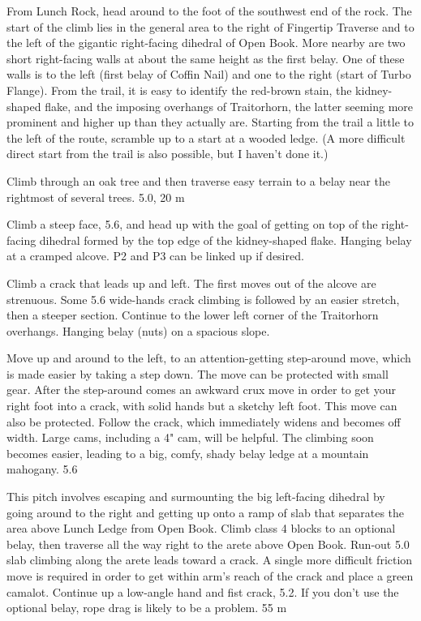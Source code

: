 \documentclass{tahquitz}
\begin{document}
From Lunch Rock, head around to the foot of the southwest end of the
rock.  The start of the climb lies in the general area to the right of
Fingertip Traverse and to the left of the gigantic right-facing
dihedral of Open Book.  More nearby are two short right-facing walls
at about the same height as the first belay.  One of these walls is to
the left (first belay of Coffin Nail) and one to the right (start of
Turbo Flange).  From the trail, it is easy to identify the red-brown
stain, the kidney-shaped flake, and the imposing overhangs of
Traitorhorn, the latter seeming more prominent and higher up than they
actually are.  Starting from the trail a little to the left of the
route, scramble up to a start at a wooded ledge.  (A more difficult
direct start from the trail is also possible, but I haven't done it.) 

\somespace

 Climb through an oak tree and then traverse
easy terrain to a belay near the rightmost of several trees.  5.0, 20 m

 Climb a steep face, 5.6, and
head up with the goal of getting on top of the right-facing
dihedral formed by the top edge of the kidney-shaped flake. Hanging belay at a
cramped alcove. P2 and P3 can be linked up if desired.

 Climb a crack that leads up and left. The first moves
out of the alcove are strenuous. Some 5.6 wide-hands crack climbing is followed by an
easier stretch, then a steeper section.  Continue to the lower
left corner of the Traitorhorn overhangs. Hanging belay (nuts) on a spacious
slope.

 Move up and around to the left, to an attention-getting step-around move,
which is made easier by taking a step down. The move can be protected with small
gear. After the step-around comes an awkward crux move in order to get your right foot
into a crack, with solid hands but a sketchy left foot. This move can also be protected.
Follow the crack, which immediately widens and becomes off width.
Large cams, including a 4" cam,
will be helpful. The climbing soon becomes easier, leading to
a big, comfy, shady belay ledge at a mountain mahogany. 5.6

 This pitch involves escaping and surmounting the big left-facing dihedral by
going around to the right and getting up onto a ramp of slab that separates
the area above Lunch Ledge from Open Book. Climb class 4 blocks to an optional belay, then 
traverse all the way right to the arete above Open Book. Run-out 5.0 slab climbing along the
arete leads toward a crack. A single more difficult friction move is required in order to
get within arm's reach of the crack and place a green camalot.
Continue up a low-angle hand and fist crack, 5.2.
If you don't use the optional belay, rope drag is likely to be a problem. 55 m
\end{document}
